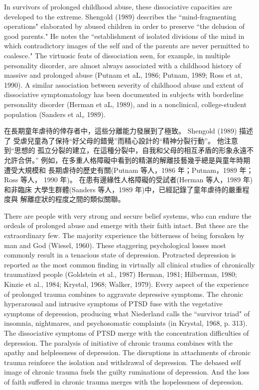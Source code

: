 \documentclass[12pt]{article}
\begin{document}
    In survivors of prolonged childhood abuse, these dissociative capacities
    are developed to the extreme. Shengold (1989) describes the
    ``mind-fragmenting operations" elaborated by abused children in order to
    preserve ``the delusion of good parents." He notes the ``establishment of
    isolated divisions of the mind in which contradictory images of the self
    and of the parents are never permitted to coalesce." The virtuosic feats of
    dissociation seen, for example, in multiple personality disorder, are
    almost always associated with a childhood history of massive and prolonged
    abuse (Putnam et aL, 1986; Putnam, 1989; Ross et at, 1990). A similar
    association between severity of childhood abuse and extent of dissociative
    symptomatology has been documented in subjects with borderline personality
    disorder (Herman et aL, 1989), and in a nonclinical, college-student
    population (Sanders et al„ 1989).

    在長期童年虐待的倖存者中，這些分離能力發展到了極致。 Shengold (1989) 描述了
    受虐兒童為了保持“好父母的錯覺”而精心設計的“精神分裂行動”。 他注意到“思想的
    孤立分裂的建立，在這種分裂中，自我和父母的相互矛盾的形象永遠不允許合併。”
    例如，在多重人格障礙中看到的精湛的解離技藝幾乎總是與童年時期遭受大規模和
    長期虐待的歷史有關(Putnam 等人，1986 年；Putnam，1989 年；Ross 等人，
    1990 年)。 在患有邊緣性人格障礙的受試者(Herman 等人，1989 年)和非臨床
    大學生群體(Sanders 等人，1989 年)中，已經記錄了童年虐待的嚴重程度與
    解離症狀的程度之間的類似關聯。

    There are people with very strong and secure belief systems, who can endure
    the ordeals of prolonged abuse and emerge with their faith intact. But
    these are the extraordinary few. The majority experience the bitterness of
    being forsaken by man and God (Wiesel, 1960). These staggering
    psychological losses most commonly result in a tenacious state of
    depression. Protracted depression is reported as the most common finding in
    virtually all clinical studies of chronically traumatized people
    (Goldstein et al., 1987) Herman, 1981; Hilberman, 1980; Kinzie et al.,
    1984; Krystal, 1968; Walker, 1979). Every aspect of the experience of
    prolonged trauma combines to aggravate depressive symptoms. The chronic
    hyperarousal and intrusive symptoms of PTSD fuse with the vegetative
    symptoms of depression, producing what Niederland calls the ``survivor
    triad" of insomnia, nightmares, and psychosomatic complaints (in Krystal,
    1968, p. 313). The dissociative symptoms of PTSD merge with the
    concentration difficulties of depression. The paralysis of initiative of
    chronic trauma combines with the apathy and helplessness of depression. The
    disruptions in attachments of chronic trauma reinforce the isolation and
    withdrawal of depression. The debased self image of chronic trauma fuels
    the guilty ruminations of depression. And the loss of faith suffered in
    chronic trauma merges with the hopelessness of depression.
\end{document}
